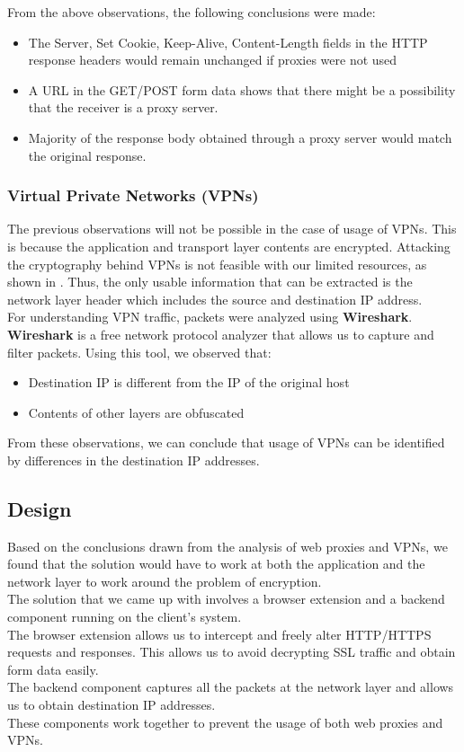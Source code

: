 \documentclass[a4paper,11pt,twocolumn]{article}
\begin{document}
From the above observations, the following conclusions were made:
\begin{itemize}
\item The Server, Set Cookie, Keep-Alive, Content-Length fields in the HTTP response headers would remain unchanged if proxies were not used
\item A URL in the GET/POST form data shows that there might be a possibility that the receiver is a proxy server.
\item Majority of the response body obtained through a proxy server would match the original response.
\end{itemize}

\subsubsection{Virtual Private Networks (VPNs)}
The previous observations will not be possible in the case of usage of VPNs. This is because the application and transport layer contents are encrypted. Attacking the cryptography behind VPNs is not feasible with our limited resources, as shown in \cite{adrianimperfect}. Thus, the only usable information that can be extracted is the network layer header which includes the source and destination IP address.\\
For understanding VPN traffic, packets were analyzed using \textbf{Wireshark}. \textbf{Wireshark} is a free network protocol analyzer that allows us to capture and filter packets. Using this tool, we observed that:
\begin{itemize}
\item Destination IP is different from the IP of the original host
\item Contents of other layers are obfuscated
\end{itemize}

From these observations, we can conclude that usage of VPNs can be identified by differences in the destination IP addresses.

\subsection{Design}
Based on the conclusions drawn from the analysis of web proxies and VPNs, we found that the solution would have to work at both the application and the network layer to work around the problem of encryption.\\
The solution that we came up with involves a browser extension and a backend component running on the client's system. \\The browser extension allows us to intercept and freely alter HTTP/HTTPS requests and responses. This allows us to avoid decrypting SSL traffic and obtain form data easily. \\The backend component captures all the packets at the network layer and allows us to obtain destination IP addresses.\\
These components work together to prevent the usage of both web proxies and VPNs.\\
\end{document}
